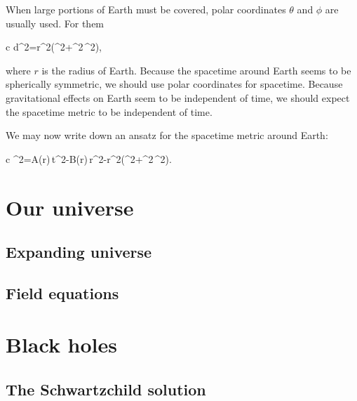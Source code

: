 \documentclass[11pt,oneside%
]{memoir}
\newenvironment{eqna}{\begin{IEEEeqnarray*}{c}}{\end{IEEEeqnarray*}\ignorespacesafterend}
\newcommand{\dd}{\mathrm{d}}
\begin{document}
When large portions of Earth must be covered, polar coordinates \(\theta\) and \(\phi\) are usually used. For them
\begin{eqna}
\dd d^2=r^2\left(\dd\theta^2+\sin^2\theta\,\dd\phi^2\right),
\end{eqna}
where \(r\) is the radius of Earth. Because the spacetime around Earth seems to be spherically symmetric, we should use polar coordinates for spacetime. Because gravitational effects on Earth seem to be independent of time, we should expect the spacetime metric to be independent of time.

We may now write down an ansatz for the spacetime metric around Earth:
\begin{eqna}
\dd\tau^2=A(r)\,\dd t^2-B(r)\,\dd r^2-r^2\left(\dd\theta^2+\sin^2\theta\,\dd\phi^2\right).
\end{eqna}


%





\chapter{Our universe}


\section{Expanding universe}


\section{Field equations}

\chapter{Black holes}

\section{The Schwartzchild solution}
\end{document}
